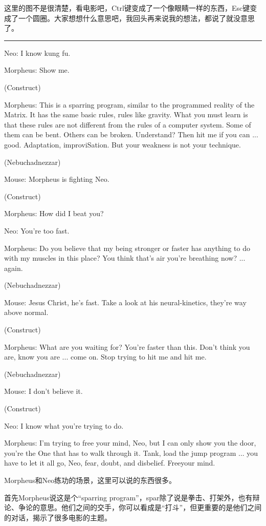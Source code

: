 \documentclass[UTF8]{ctexart}
\newcommand{\myparsep}{\noindent \rule[0.5ex]{\linewidth}{1pt}}
\newenvironment{myquote}{\color{green} \setlength{\leftskip}{6em} \setlength{\rightskip}{4em} \setlength{\parindent}{-2em}}{\par}
\begin{document}
这里的图不是很清楚，看电影吧，Ctrl键变成了一个像眼睛一样的东西，Esc键变成了一个圆圈。大家想想什么意思吧，我回头再来说我的想法，都说了就没意思了。

\myparsep

\begin{myquote}
Neo: I know kung fu.

Morpheus: Show me.

(Construct)

Morpheus: This is a sparring program, similar to the programmed reality of the Matrix. It has the same basic rules, rules like gravity. What you must learn is that these rules are not different from the rules of a computer system. Some of them can be bent. Others can be broken. Understand? Then hit me if you can ... good. Adaptation, improviSation. But your weakness is not your technique.

(Nebuchadnezzar)

Mouse: Morpheus is fighting Neo.

(Construct)

Morpheus: How did I beat you?

Neo: You're too fast.

Morpheus: Do you believe that my being stronger or faster has anything to do with my muscles in this place? You think that's air you're breathing now? ... again.

(Nebuchadnezzar)

Mouse: Jesus Christ, he's fast. Take a look at his neural-kinetics, they're way above normal.

(Construct)

Morpheus: What are you waiting for? You're faster than this. Don't think you are, know you are ... come on. Stop trying to hit me and hit me.

(Nebuchadnezzar)

Mouse: I don't believe it.

(Construct)

Neo: I know what you're trying to do.

Morpheus: I'm trying to free your mind, Neo, but I can only show you the door, you're the One that has to walk through it. Tank, load the jump program ... you have to let it all go, Neo, fear, doubt, and disbelief. Freeyour mind.
\end{myquote}

Morpheus和Neo练功的场景，这里可以说的东西很多。

首先Morpheus说这是个“sparring program”，spar除了说是拳击、打架外，也有辩论、争论的意思。他们之间的交手，你可以看成是“打斗”，但更重要的是他们之间的对话，揭示了很多电影的主题。
\end{document}
